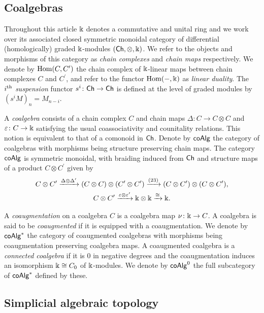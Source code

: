 \subsection{Coalgebras}\label{ss:coalgebras}

Throughout this article $\Bbbk$ denotes a commutative and unital ring and we work over its associated closed symmetric monoidal category of differential (homologically) graded $\Bbbk$-modules $(\mathsf{Ch}, \otimes, \Bbbk)$.
We refer to the objects and morphisms of this category as \textit{chain complexes} and \textit{chain maps} respectively.
We denote by $\mathrm{Hom}(C, C^\prime)$ the chain complex of $\Bbbk$-linear maps between chain complexes $C$ and $C^\prime$, and refer to the functor $\mathrm{Hom}(-, \Bbbk)$ as \textit{linear duality}.
The $i^{\mathrm{th}}$ \textit{suspension} functor $s^i \colon \mathsf{Ch} \to \mathsf{Ch}$ is defined at the level of graded modules by $(s^{i}M)_n = M_{n-i}$.

A \textit{coalgebra} consists of a chain complex $C$ and chain maps $\Delta \colon C \to C \otimes C$ and $\varepsilon \colon C \to \Bbbk$ satisfying the usual coassociativity and counitality relations.
This notion is equivalent to that of a comonoid in $\mathsf{Ch}$.
Denote by $\mathsf{coAlg}$ the category of coalgebras with morphisms being structure preserving chain maps.
The category $\mathsf{coAlg}$ is symmetric monoidal, with braiding induced from $\mathsf{Ch}$ and structure maps of a product $C \otimes C^\prime$ given by
\begin{gather*}
	C \otimes C^\prime \xrightarrow{\Delta \otimes \Delta^\prime}
	(C \otimes C) \otimes (C^\prime \otimes C^\prime) \xrightarrow{(23)}
	(C \otimes C^\prime) \otimes (C \otimes C^\prime), \\
	C \otimes C^\prime \xrightarrow{\varepsilon \otimes \varepsilon^\prime}
	\Bbbk \otimes \Bbbk \xrightarrow{\cong} \Bbbk.
\end{gather*}

A \textit{coaugmentation} on a coalgebra $C$ is a coalgebra map $\nu \colon \Bbbk \to C$.
A coalgebra is said to be \textit{coaugmented} if it is equipped with a coaugmentation.
We denote by $\mathsf{coAlg}^\ast$ the category of coaugmented coalgebras with morphisms being coaugmentation preserving coalgebra maps.
A coaugmented coalgebra is a \textit{connected coalgebra} if it is $0$ in negative degrees and the coaugmentation induces an isomorphism $\Bbbk \cong C_0$ of $\Bbbk$-modules.
We denote by $\mathsf{coAlg}^0$ the full subcategory of $\mathsf{coAlg}^\ast$ defined by these.

\subsection{Simplicial algebraic topology}

